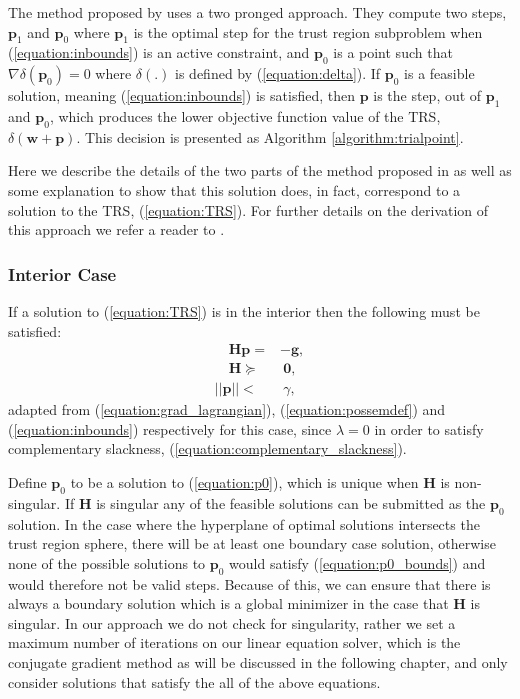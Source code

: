 \documentclass[letterpaper,12pt,titlepage,oneside,final]{book}
\begin{document}
	The method proposed by \cite{adachi.paper} uses a two pronged approach. They compute two steps, $\mathbf{p}_{1}$ and $\mathbf{p}_{0}$ where $\mathbf{p}_{1}$ is the optimal step for the trust region subproblem when (\ref{equation:inbounds}) is an active constraint, and $\mathbf{p}_{0}$ is a point such that $\nabla\delta(\mathbf{p}_{0}) = 0$ where $\delta(.)$ is defined by (\ref{equation:delta}). If $\mathbf{p}_{0}$ is a feasible solution, meaning (\ref{equation:inbounds}) is satisfied, then $\mathbf{p}$ is the step, out of $\mathbf{p}_{1}$ and $\mathbf{p}_{0}$, which produces the lower objective function value of the TRS, $\delta(\mathbf{w + p})$. This decision is presented as Algorithm \ref{algorithm:trialpoint}.
	
	Here we describe the details of the two parts of the method proposed in \cite{adachi.paper} as well as some explanation to show that this solution does, in fact, correspond to 
	a solution to the TRS, (\ref{equation:TRS}). For further details on the derivation of this approach we refer a reader to \cite{adachi.paper}. 
	
	\subsubsection{Interior Case}
	
	If a solution to (\ref{equation:TRS}) is in the interior then the following must be satisfied:
	\begin{subequations}
		\begin{align}
		\quad \mathbf{Hp} = & -\mathbf{g}, \label{equation:p0} \\
		\quad \mathbf{H} \succeq & \ \mathbf{0},\label{equation:p0_posdef} \\ 
		||\mathbf{p}|| < & \ \gamma, \label{equation:p0_bounds}  
		\end{align}
	\end{subequations}
	adapted from (\ref{equation:grad_lagrangian}), (\ref{equation:possemdef}) and (\ref{equation:inbounds}) respectively for this case, since $\lambda = 0$ in order to satisfy complementary slackness, (\ref{equation:complementary_slackness}).
	
	Define $\mathbf{p}_{0}$ to be a solution to (\ref{equation:p0}), which is unique when $\mathbf{H}$ is non-singular. If $\mathbf{H}$ is singular any of the feasible solutions can be submitted as the $\mathbf{p}_{0}$ solution. In the case where the hyperplane of optimal solutions intersects the trust region sphere, there will be at least one boundary case solution, otherwise none of the possible solutions to $\mathbf{p}_{0}$ would satisfy (\ref{equation:p0_bounds}) and would therefore not be valid steps. Because of this, we can ensure that there is always a boundary solution which is a global minimizer in the case that $\mathbf{H}$ is singular. In our approach we do not check for singularity, rather we set a maximum number of iterations on our linear equation solver, which is the conjugate gradient method as will be discussed in the following chapter, and only consider solutions that satisfy the all of the above equations. 
	
\end{document}
